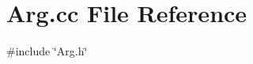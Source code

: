 \section{Arg.\+cc File Reference}
\label{Arg_8cc}
{\ttfamily \#include \char`\"{}Arg.\+h\char`\"{}}\newline
